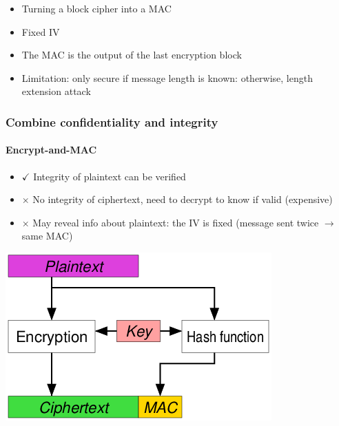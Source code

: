 \documentclass{article}
\newenvironment{Figure}
  {\par\medskip\noindent\minipage{\linewidth}}
  {\endminipage\par\medskip}
\newcommand{\xmark}{\times}
\newenvironment{myitemize}
{ \begin{itemize}
    \setlength{\itemsep}{005pt}
    \setlength{\parskip}{0pt}
    \setlength{\parsep}{0pt}     }
{ \end{itemize}                  }
\begin{document}
\begin{multicols}{2}
\begin{myitemize}
    \item Turning a block cipher into a MAC
    \item Fixed IV
    \item The MAC is the output of the last encryption block 
    \item Limitation: only secure if message length is known: otherwise, length extension attack 
\end{myitemize}

\subsubsection{Combine confidentiality and integrity}

\paragraph{Encrypt-and-MAC}

\begin{myitemize}
     \item[$\checkmark$] Integrity of plaintext can be verified
     \item[$\xmark$] No integrity of ciphertext, need to decrypt to know if valid (expensive)
     \item[$\xmark$] May reveal info about plaintext: the IV is fixed (message sent twice $\rightarrow$ same MAC)
\end{myitemize}

\begin{Figure}
 \centering
 \includegraphics[width=\linewidth]{img/w4_applied_crypto_encrypt_and_mac.png}
\end{Figure}



\end{multicols}
\end{document}
